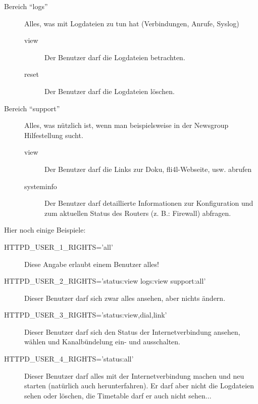 \begin{description}
{\begin{description}
      \item[Bereich ``logs''] Alles, was mit Logdateien zu tun hat
            (Verbindungen, Anrufe, Syslog)
        \begin{description}
        \item[view] Der Benutzer darf die Logdateien betrachten.
        \item[reset] Der Benutzer darf die Logdateien löschen.
        \end{description}

      \item[Bereich ``support''] Alles, was nützlich ist, wenn man beispielsweise
                    in der Newsgroup Hilfestellung sucht.
        \begin{description}
        \item[view] Der Benutzer darf die Links zur Doku, fli4l-Webseite, usw. abrufen
        \item[systeminfo] Der Benutzer darf detaillierte Informationen zur Konfiguration
	                  und zum aktuellen Status des Routers (z. B.: Firewall) abfragen.
        \end{description}

      \end{description}

    Hier noch einige Beispiele:
        
      \begin{description}
      \item[HTTPD\_USER\_1\_RIGHTS='all']
        Diese Angabe erlaubt einem Benutzer alles!

      \item[HTTPD\_USER\_2\_RIGHTS='status:view logs:view support:all']
        Dieser Benutzer darf sich zwar alles ansehen, aber nichts
        ändern.

      \item[HTTPD\_USER\_3\_RIGHTS='status:view,dial,link']
        Dieser Benutzer darf sich den Status der Internetverbindung
        ansehen, wählen und Kanalbündelung ein- und ausschalten.

      \item[HTTPD\_USER\_4\_RIGHTS='status:all']
        Dieser Benutzer darf alles mit der Internetverbindung machen
        und neu starten (natürlich auch herunterfahren). Er darf aber
        nicht die Logdateien sehen oder löschen, die Timetable darf
        er auch nicht sehen...
      \end{description}
    }

\end{description}

